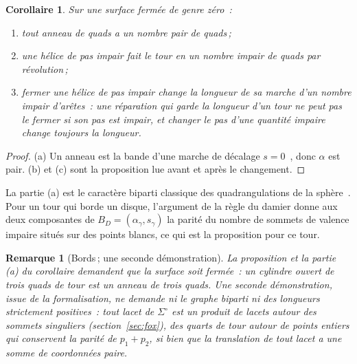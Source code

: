\documentclass[11pt,a4paper]{article}
\newtheorem{corollary}{Corollaire}
\newtheorem{remark}{Remarque}
\newcommand{\shift}{s}
\newcommand{\lean}[1]{\texttt{\detokenize{#1}}}
\newenvironment{evidence}[3][]{}{}
\begin{document}
\begin{evidence}{core}{\lean{ring_even}, \lean{odd_pitch_odd_length}, \lean{repair_keeps_length_cannot_close}, \lean{odd_change_of_pitch_changes_length}\,; supposé~: comme la proposition ci-dessus}
\begin{corollary}\label{cor:parity}
Sur une surface fermée de genre zéro~:
\begin{enumerate}
\item[(a)] tout anneau de quads a un nombre pair de quads\,;
\item[(b)] une hélice de pas impair fait le tour en un nombre impair de quads
  par révolution\,;
\item[(c)] fermer une hélice de pas impair change la longueur de sa marche
  d'un nombre impair d'arêtes~: une réparation qui garde la longueur d'un tour
  ne peut pas le fermer si son pas est impair, et changer le pas d'une
  quantité impaire change toujours la longueur.
\end{enumerate}
\end{corollary}
\end{evidence}

\begin{proof}
(a) Un anneau est la bande d'une marche de décalage $\shift =
0$~\cite[prop.~2]{gardent2026loops}, donc $\alpha$ est pair. (b) et (c) sont
la proposition lue avant et après le changement.
\end{proof}

La partie (a) est le caractère biparti classique des quadrangulations de la
sphère~\cite[lemme~3.1]{kaiser2015colouring}. Pour un tour qui borde un
disque, l'argument de la règle du damier donne aux deux composantes de $B_D =
(\alpha_\gamma, \shift_\gamma)$ la parité du nombre de sommets de valence
impaire situés sur des points blancs, ce qui est la proposition pour ce tour.

\begin{evidence}{core}{\lean{colour_hol_trans}\,; supposé~: le tour est un mot en les lacets autour des points coniques}
\begin{remark}[Bords\,; une seconde démonstration]\label{rem:borders}
La proposition et la partie (a) du corollaire demandent que la surface soit
fermée~: un cylindre ouvert de trois quads de tour est un anneau de trois
quads. Une seconde démonstration, issue de la formalisation, ne demande ni le
graphe biparti ni des longueurs strictement positives~: tout lacet de
$\Sigma^\circ$ est un produit de lacets autour des sommets singuliers
(section~\ref{sec:fox}), des quarts de tour autour de points entiers qui
conservent la parité de $p_1 + p_2$, si bien que la translation de tout lacet
a une somme de coordonnées paire.
\end{remark}
\end{evidence}
\end{document}
